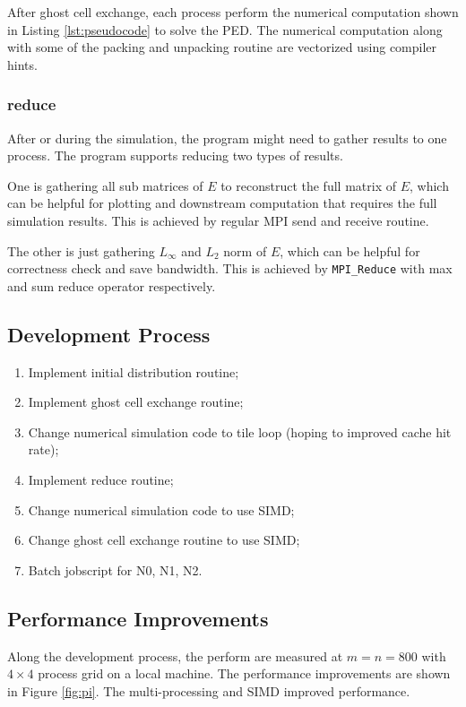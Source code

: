 \documentclass[12pt]{article}
\begin{document}
After ghost cell exchange, each process perform the numerical computation shown in Listing \ref{lst:pseudocode} to solve the PED.
The numerical computation along with some of the packing and unpacking routine are vectorized using compiler hints.

\subsubsection{reduce}
After or during the simulation, the program might need to gather results to one process.
The program supports reducing two types of results.

One is gathering all sub matrices of $E$ to reconstruct the full matrix of $E$,
which can be helpful for plotting and downstream computation that requires the full simulation results.
This is achieved by regular MPI send and receive routine.

The other is just gathering $L_\infty$ and $L_2$ norm of $E$,
which can be helpful for correctness check and save bandwidth.
This is achieved by \texttt{MPI\_Reduce} with max and sum reduce operator respectively.

\subsection{Development Process}
\begin{enumerate}
    \item Implement initial distribution routine;
    \item Implement ghost cell exchange routine;
    \item Change numerical simulation code to tile loop (hoping to improved cache hit rate);
    \item Implement reduce routine;
    \item Change numerical simulation code to use SIMD;
    \item Change ghost cell exchange routine to use SIMD;
    \item Batch jobscript for N0, N1, N2.
\end{enumerate}


\subsection{Performance Improvements}
Along the development process, the perform are measured at $m=n=800$ with $4\times4$ process grid on a local machine.
The performance improvements are shown in Figure \ref{fig:pi}.
The multi-processing and SIMD improved performance.
\end{document}
